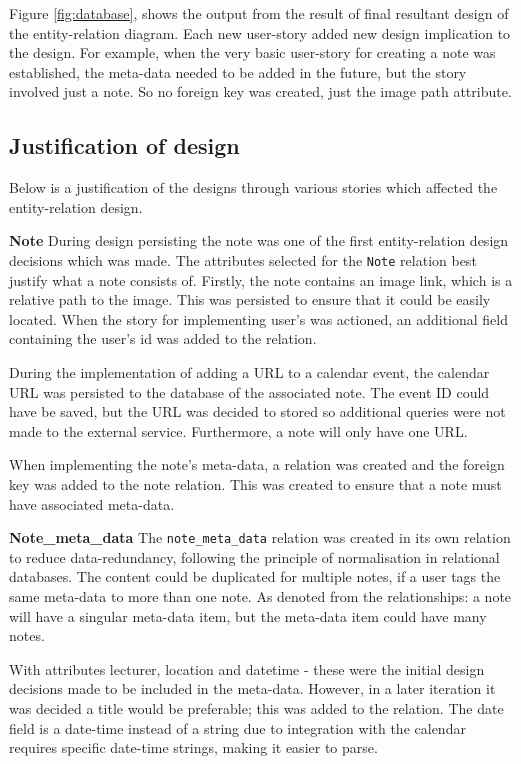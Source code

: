 Figure \ref{fig:database}, shows the output from the result of final resultant design of the entity-relation diagram. Each new user-story added new design implication to the design. For example, when the very basic user-story for creating a note was established, the meta-data needed to be added in the future, but the story involved just a note. So no foreign key was created, just the image path attribute.

\subsection{Justification of design}
Below is a justification of the designs through various stories which affected the entity-relation design.

\noindent
\textbf{Note}
\newline
During design persisting the note was one of the first entity-relation design decisions which was made. The attributes selected for the \texttt{Note} relation best justify what a note consists of. Firstly, the note contains an image link, which is a relative path to the image. This was persisted to ensure that it could be easily located. When the story for implementing user's was actioned, an additional field containing the user's id was added to the relation.

During the implementation of adding a URL to a calendar event, the calendar URL was persisted to the database of the associated note. The event ID could have be saved, but the URL was decided to stored so additional queries were not made to the external service. Furthermore, a note will only have one URL.

When implementing the note's meta-data, a relation was created and the foreign key was added to the note relation. This was created to ensure that a note must have associated meta-data.

\noindent
\textbf{Note\_meta\_data}
\newline
The \texttt{note\_meta\_data} relation was created in its own relation to reduce data-redundancy, following the principle of normalisation in relational databases. The content could be duplicated for multiple notes, if a user tags the same meta-data to more than one note. As denoted from the relationships: a note will have a singular meta-data item, but the meta-data item could have many notes.

With attributes lecturer, location and datetime - these were the initial design decisions made to be included in the meta-data. However, in a later iteration it was decided a title would be preferable; this was added to the relation. The date field is a date-time instead of a string due to integration with the calendar requires specific date-time strings, making it easier to parse.


